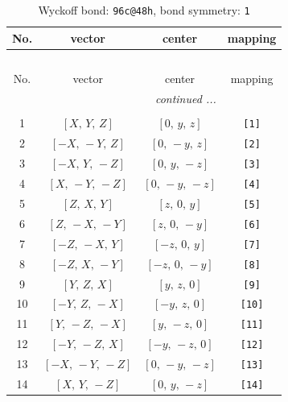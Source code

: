\documentclass[fleqn,8pt]{jsarticle}
\begin{document}
\begin{longtable}{cccc}
\caption{Wyckoff bond: {\tt 96c@48h}, bond symmetry: {\tt 1}}
 \\
 \hline \hline
No. & vector & center & mapping \\ \hline \endfirsthead

\multicolumn{3}{l}{\tablename\ \thetable{}} \\
 \hline \hline
No. & vector & center & mapping \\ \hline \endhead

 \hline \hline
\multicolumn{3}{r}{\footnotesize\it continued ...} \\ \endfoot

 \hline \hline
\multicolumn{3}{r}{} \\ \endlastfoot

1 & $\left[ X,\, Y,\, Z \right]$ & $\left[ 0,\, y,\, z \right]$ & {\tt [1]} \\ \hline
2 & $\left[ - X,\, - Y,\, Z \right]$ & $\left[ 0,\, - y,\, z \right]$ & {\tt [2]} \\ \hline
3 & $\left[ - X,\, Y,\, - Z \right]$ & $\left[ 0,\, y,\, - z \right]$ & {\tt [3]} \\ \hline
4 & $\left[ X,\, - Y,\, - Z \right]$ & $\left[ 0,\, - y,\, - z \right]$ & {\tt [4]} \\ \hline
5 & $\left[ Z,\, X,\, Y \right]$ & $\left[ z,\, 0,\, y \right]$ & {\tt [5]} \\ \hline
6 & $\left[ Z,\, - X,\, - Y \right]$ & $\left[ z,\, 0,\, - y \right]$ & {\tt [6]} \\ \hline
7 & $\left[ - Z,\, - X,\, Y \right]$ & $\left[ - z,\, 0,\, y \right]$ & {\tt [7]} \\ \hline
8 & $\left[ - Z,\, X,\, - Y \right]$ & $\left[ - z,\, 0,\, - y \right]$ & {\tt [8]} \\ \hline
9 & $\left[ Y,\, Z,\, X \right]$ & $\left[ y,\, z,\, 0 \right]$ & {\tt [9]} \\ \hline
10 & $\left[ - Y,\, Z,\, - X \right]$ & $\left[ - y,\, z,\, 0 \right]$ & {\tt [10]} \\ \hline
11 & $\left[ Y,\, - Z,\, - X \right]$ & $\left[ y,\, - z,\, 0 \right]$ & {\tt [11]} \\ \hline
12 & $\left[ - Y,\, - Z,\, X \right]$ & $\left[ - y,\, - z,\, 0 \right]$ & {\tt [12]} \\ \hline
13 & $\left[ - X,\, - Y,\, - Z \right]$ & $\left[ 0,\, - y,\, - z \right]$ & {\tt [13]} \\ \hline
14 & $\left[ X,\, Y,\, - Z \right]$ & $\left[ 0,\, y,\, - z \right]$ & {\tt [14]} \\ \hline

\end{longtable}
\end{document}
